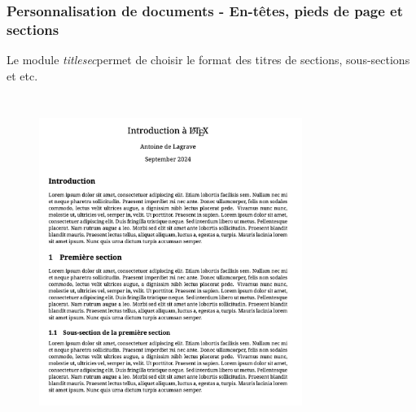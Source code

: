 \begin{frame}
    \frametitle{Personnalisation de documents - En-têtes, pieds de page et sections}
    Le module \textcolor{vibrant_green}{\textit{titlesec}}\footnotemark permet de choisir le format des titres de sections, sous-sections et etc.
    \begin{columns}
        \begin{figure}
           \centering
            \includegraphics[scale=0.2]{./figures/titlesec.png}
            \label{fig: titlesec}
        \end{figure}
        \begin{figure}
           \centering

\end{figure}
\end{columns}
\end{frame}
